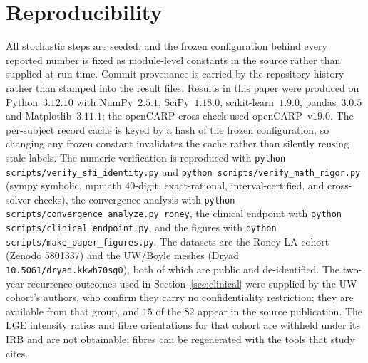 \documentclass[11pt]{article}
\theoremstyle{definition}
\newcommand{\code}[1]{\texttt{#1}}
\begin{document}
\section{Reproducibility}
All stochastic steps are seeded, and the frozen configuration behind every
reported number is fixed as module-level constants in the source rather than
supplied at run time. Commit provenance is carried by the repository history
rather than stamped into the result files. Results in this paper were produced on
Python~$3.12.10$ with NumPy~$2.5.1$, SciPy~$1.18.0$, scikit-learn~$1.9.0$,
pandas~$3.0.5$ and Matplotlib~$3.11.1$; the openCARP cross-check used
openCARP~v$19.0$. The per-subject record cache is keyed by a hash of the frozen
configuration, so changing any frozen constant invalidates the cache rather than
silently reusing stale labels. The numeric verification is reproduced with
\code{python scripts/\allowbreak verify\allowbreak\_sfi\allowbreak\_identity.py}
and
\code{python scripts/\allowbreak verify\allowbreak\_math\allowbreak\_rigor.py}
(sympy symbolic, mpmath 40-digit, exact-rational, interval-certified, and
cross-solver checks), the convergence analysis with
\code{python scripts/\allowbreak convergence\allowbreak\_analyze.py roney}, the
clinical endpoint with
\code{python scripts/\allowbreak clinical\allowbreak\_endpoint.py}, and the
figures with \code{python scripts/\allowbreak make\allowbreak\_paper\allowbreak\_figures.py}. The datasets are
the Roney LA cohort (Zenodo 5801337) and the UW/Boyle meshes (Dryad
\code{10.5061/\allowbreak dryad.kkwh70sg0}), both of which are public and
de-identified. The
two-year recurrence outcomes used in Section~\ref{sec:clinical} were supplied by
the UW cohort's authors, who confirm they carry no confidentiality restriction;
they are available from that group, and $15$ of the $82$ appear in the source
publication. The LGE intensity ratios and fibre orientations for that cohort are
withheld under its IRB and are not obtainable; fibres can be regenerated with
the tools that study cites.
\end{document}
